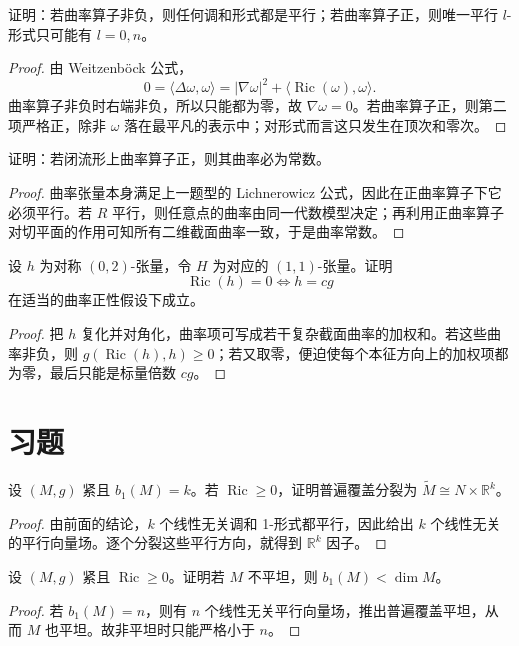 \documentclass[11pt,a4paper,openany]{ctexbook}
\numberwithin{equation}{chapter}
\begin{document}
\begin{problem}
证明：若曲率算子非负，则任何调和形式都是平行；若曲率算子正，则唯一平行 \(l\)-形式只可能有 \(l=0,n\)。
\end{problem}
\begin{proof}
由 Weitzenb\"ock 公式，
\[
0=\langle \Delta\omega,\omega\rangle=|\nabla\omega|^2+\langle \operatorname{Ric}(\omega),\omega\rangle.
\]
曲率算子非负时右端非负，所以只能都为零，故 \(\nabla\omega=0\)。若曲率算子正，则第二项严格正，除非 \(\omega\) 落在最平凡的表示中；对形式而言这只发生在顶次和零次。
\end{proof}

\begin{problem}
证明：若闭流形上曲率算子正，则其曲率必为常数。
\end{problem}
\begin{proof}
曲率张量本身满足上一题型的 Lichnerowicz 公式，因此在正曲率算子下它必须平行。若 \(R\) 平行，则任意点的曲率由同一代数模型决定；再利用正曲率算子对切平面的作用可知所有二维截面曲率一致，于是曲率常数。
\end{proof}

\begin{problem}
设 \(h\) 为对称 \((0,2)\)-张量，令 \(H\) 为对应的 \((1,1)\)-张量。证明
\[
\operatorname{Ric}(h)=0\iff h=cg
\]
在适当的曲率正性假设下成立。
\end{problem}
\begin{proof}
把 \(h\) 复化并对角化，曲率项可写成若干复杂截面曲率的加权和。若这些曲率非负，则 \(g(\operatorname{Ric}(h),h)\ge 0\)；若又取零，便迫使每个本征方向上的加权项都为零，最后只能是标量倍数 \(cg\)。
\end{proof}

\section{习题}

\begin{exercise}
设 \((M,g)\) 紧且 \(b_1(M)=k\)。若 \(\operatorname{Ric}\ge 0\)，证明普遍覆盖分裂为 \(\widetilde M\cong N\times\mathbb R^k\)。
\end{exercise}
\begin{proof}
由前面的结论，\(k\) 个线性无关调和 1-形式都平行，因此给出 \(k\) 个线性无关的平行向量场。逐个分裂这些平行方向，就得到 \(\mathbb R^k\) 因子。
\end{proof}

\begin{exercise}
设 \((M,g)\) 紧且 \(\operatorname{Ric}\ge 0\)。证明若 \(M\) 不平坦，则 \(b_1(M)<\dim M\)。
\end{exercise}
\begin{proof}
若 \(b_1(M)=n\)，则有 \(n\) 个线性无关平行向量场，推出普遍覆盖平坦，从而 \(M\) 也平坦。故非平坦时只能严格小于 \(n\)。
\end{proof}
\end{document}
